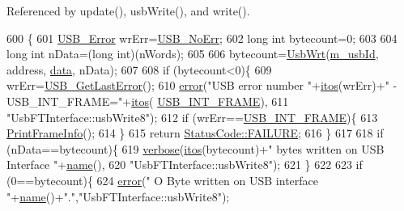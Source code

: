 Referenced by update(), usb\+Write(), and write().


\begin{DoxyCode}
600                                                              \{
601   \hyperlink{LALUsbML_8h_aa7e5a2302774d5aa1d48a2a1cfc46e86}{USB\_Error} wrErr=\hyperlink{LALUsbML_8h_ab44759ae95dd86cbc2855adf525c43cd}{USB\_NoErr};
602   \textcolor{keywordtype}{long} \textcolor{keywordtype}{int}  bytecount=0;
603 
604   \textcolor{keywordtype}{long} \textcolor{keywordtype}{int} nData=(\textcolor{keywordtype}{long} int)(nWords);
605 
606   bytecount=\hyperlink{LALUsbML_8h_a417eaf04d96bd2d3fca0111f8003bcb0}{UsbWrt}(\hyperlink{classUsbFTInterface_a91df5c0547e8be460bc087e27afe05aa}{m\_usbId}, address, \hyperlink{namespaceshell_a5ea2525995cedc3efd69ea8a7f034d1e}{data}, nData);
607 
608   \textcolor{keywordflow}{if} (bytecount<0)\{
609     wrErr=\hyperlink{LALUsbML_8h_a1662b77c9968848acf173f6f9c765ddd}{USB\_GetLastError}();
610     \hyperlink{classObject_a204a95f57818c0f811933917a30eff45}{error}(\textcolor{stringliteral}{"USB error number "}+\hyperlink{Tools_8h_af330027dbdafb9a30768b3613c553e60}{itos}(wrErr)+\textcolor{stringliteral}{" - USB\_INT\_FRAME="}+\hyperlink{Tools_8h_af330027dbdafb9a30768b3613c553e60}{itos}(
      \hyperlink{LALUsbML_8h_a68260f9cf3649507d12904cfa1592c11afd1c409187b1dfd3d66887a5e07e7ed3}{USB\_INT\_FRAME}),
611             \textcolor{stringliteral}{"UsbFTInterface::usbWrite8"});
612     \textcolor{keywordflow}{if} (wrErr==\hyperlink{LALUsbML_8h_a68260f9cf3649507d12904cfa1592c11afd1c409187b1dfd3d66887a5e07e7ed3}{USB\_INT\_FRAME})\{
613       \hyperlink{LALUsbML_8h_ab3398c17204ba7fb4b47eb9bbf4ba94e}{PrintFrameInfo}();
614     \} 
615     \textcolor{keywordflow}{return} \hyperlink{classStatusCode_a6f565cbeadc76d14c72f047e5e85eb4ba3da73d4c469762eb9d3c960368252b26}{StatusCode::FAILURE};
616   \}
617 
618   \textcolor{keywordflow}{if} (nData==bytecount)\{
619     \hyperlink{classObject_a83d2db2df682907ea1115ad721c1c4a1}{verbose}(\hyperlink{Tools_8h_af330027dbdafb9a30768b3613c553e60}{itos}(bytecount)+\textcolor{stringliteral}{" bytes written on USB Interface "}+\hyperlink{classObject_a300f4c05dd468c7bb8b3c968868443c1}{name}(),
620             \textcolor{stringliteral}{"UsbFTInterface::usbWrite8"});
621   \}
622   
623   \textcolor{keywordflow}{if} (0==bytecount)\{
624     \hyperlink{classObject_a204a95f57818c0f811933917a30eff45}{error}(\textcolor{stringliteral}{" O Byte written on USB interface "}+\hyperlink{classObject_a300f4c05dd468c7bb8b3c968868443c1}{name}()+\textcolor{stringliteral}{"."},\textcolor{stringliteral}{"UsbFTInterface::usbWrite8"});

\end{DoxyCode}
